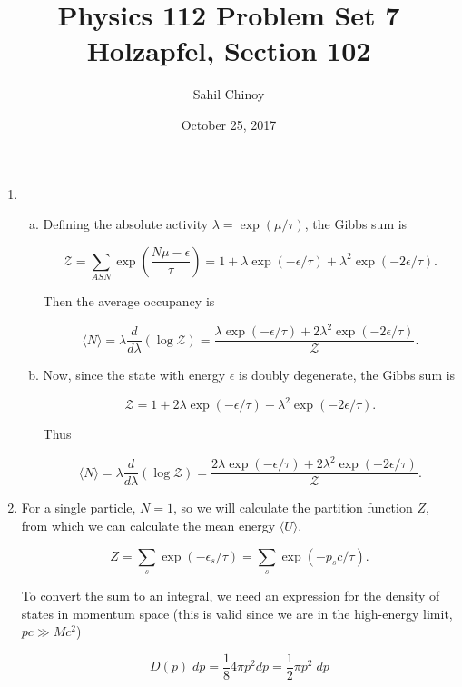 \documentclass{article}
\title{Physics 112 Problem Set 7 \\ \large{Holzapfel, Section 102}}
\author{Sahil Chinoy}
\date{October 25, 2017}
\begin{document}
\maketitle{}

\begin{enumerate}

	\item

	\begin{enumerate}[(a)]

		\item

		Defining the absolute activity $\lambda = \exp(\mu/\tau)$, the Gibbs sum is

		$$\mathcal{Z} = \sum_{ASN} \exp \left( \frac{N\mu - \epsilon}{\tau} \right) = 1 + \lambda \exp ( - \epsilon / \tau) + \lambda^2 \exp ( - 2\epsilon / \tau ).$$

		Then the average occupancy is 

		$$\langle N \rangle = \lambda \frac{d}{d\lambda} (\log \mathcal{Z}) = \frac{\lambda \exp(-\epsilon/\tau) + 2\lambda^2 \exp(-2\epsilon/\tau)}{\mathcal{Z}}.$$

		\item

		Now, since the state with energy $\epsilon$ is doubly degenerate, the Gibbs sum is

		$$\mathcal{Z} =  1 + 2 \lambda \exp ( - \epsilon / \tau) + \lambda^2 \exp ( - 2\epsilon / \tau ).$$

		Thus

		$$\langle N \rangle = \lambda \frac{d}{d\lambda} (\log \mathcal{Z}) = \frac{2\lambda \exp(-\epsilon/\tau) + 2\lambda^2 \exp(-2\epsilon/\tau)}{\mathcal{Z}}.$$


	\end{enumerate}

	\item

	For a single particle, $N=1$, so we will calculate the partition function $Z$, from which we can calculate the mean energy $\langle U \rangle$.

	$$Z = \sum_s \exp(-\epsilon_s / \tau) = \sum_s \exp(-p_sc / \tau).$$

	To convert the sum to an integral, we need an expression for the density of states in momentum space (this is valid since we are in the high-energy limit, $pc \gg Mc^2$)

	$$D(p) \; dp = \frac{1}{8} 4\pi p^2 dp = \frac{1}{2} \pi p^2 \; dp$$


\end{enumerate}
\end{document}
